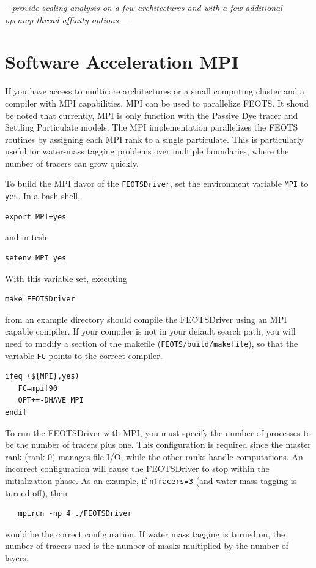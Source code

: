 \documentclass{softwaremanual}
\begin{document}
-- \textit{ provide scaling analysis on a few architectures and with a few additional openmp thread affinity options } ---

\section{Software Acceleration MPI}
If you have access to multicore architectures or a small computing cluster and a compiler with MPI capabilities, MPI can be used to parallelize FEOTS. It shoud be noted that currently, MPI is only function with the Passive Dye tracer and Settling Particulate models. The MPI implementation parallelizes the FEOTS routines by assigning each MPI rank to a single particulate. This is particularly useful for water-mass tagging problems over multiple boundaries, where the number of tracers can grow quickly. 

To build the MPI flavor of the \texttt{FEOTSDriver}, set the environment variable \texttt{MPI} to \texttt{yes}. In a bash shell,
\begin{verbatim}
export MPI=yes
\end{verbatim} 
and in tcsh
\begin{verbatim}
setenv MPI yes
\end{verbatim}
With this variable set, executing
\begin{verbatim}
make FEOTSDriver
\end{verbatim}
from an example directory should compile the FEOTSDriver using an MPI capable compiler. If your compiler is not in your default search path, you will need to modify a section of the makefile (\texttt{FEOTS/build/makefile}), so that the variable \texttt{FC} points to the correct compiler.
\begin{verbatim}
ifeq (${MPI},yes)
   FC=mpif90
   OPT+=-DHAVE_MPI
endif
\end{verbatim}

To run the FEOTSDriver with MPI, you must specify the number of processes to be the number of tracers plus one. This configuration is required since the master rank (rank 0) manages file I/O, while the other ranks handle computations. An incorrect configuration will cause the FEOTSDriver to stop within the initialization phase. As an example, if \texttt{nTracers=3} (and water mass tagging is turned off), then
\begin{verbatim}
   mpirun -np 4 ./FEOTSDriver
\end{verbatim}
would be the correct configuration. If water mass tagging is turned on, the number of tracers used is the number of masks multiplied by the number of layers.
\end{document}
